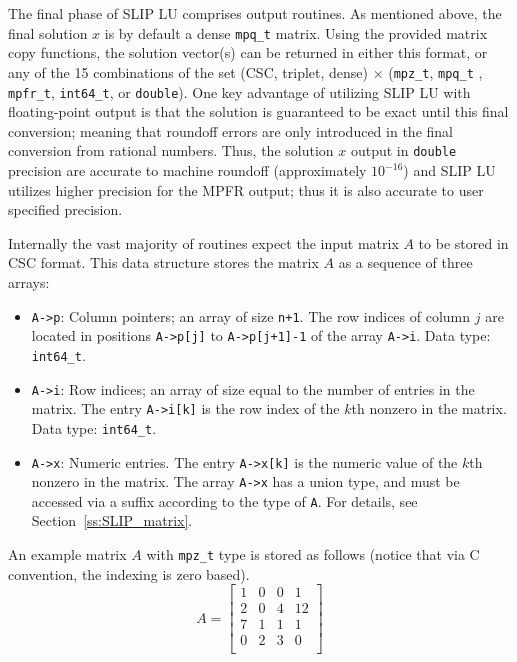 \documentclass[12pt]{article}
\theoremstyle{definition}
\begin{document}
The final phase of SLIP LU comprises output routines. As mentioned above, the
final solution $x$ is by default a dense \verb|mpq_t| matrix. Using the
provided matrix copy functions, the solution vector(s) can be returned in
either this format, or any of the 15 combinations of the set (CSC, triplet,
dense) $\times$ (\verb|mpz_t|, \verb|mpq_t| , \verb|mpfr_t|, \verb|int64_t|, or
\verb|double|).  One key advantage of utilizing SLIP LU with floating-point
output is that the solution is guaranteed to be exact until this final
conversion; meaning that roundoff errors are only introduced in the final
conversion from rational numbers. Thus, the solution $x$ output in
\verb|double| precision are accurate to machine roundoff (approximately
$10^{-16}$) and SLIP LU utilizes higher precision for the MPFR output; thus it
is also accurate to user specified precision.

Internally the vast majority of routines expect the input matrix $A$ to be stored
in CSC format. This data structure stores the matrix $A$ as a sequence of three
arrays:

\begin{itemize}
\item
\verb|A->p|: Column pointers; an array of size \verb|n+1|. The row indices of
column $j$ are located in positions \verb|A->p[j]| to \verb|A->p[j+1]-1| of the
array \verb|A->i|. Data type: \verb|int64_t|.

\item
\verb|A->i|: Row indices; an array of size equal to the number of entries in
the matrix. The entry \verb|A->i[k]| is the row index of the $k$th nonzero in
the matrix. Data type: \verb|int64_t|.

\item
\verb|A->x|: Numeric entries. The entry \verb|A->x[k]| is the numeric value of
the $k$th nonzero in the matrix.  The array \verb|A->x| has a union type, and
must be accessed via a suffix according to the type of \verb|A|.  For details,
see Section~\ref{ss:SLIP_matrix}.

\end{itemize}

An example matrix $A$ with \verb|mpz_t| type is stored as follows (notice that
via C convention, the indexing is zero based).
\[
A = \begin{bmatrix}
1 & 0 & 0 & 1 \\
2 & 0 & 4 & 12 \\
7 & 1 & 1 & 1 \\
0 & 2 & 3 & 0 \\
\end{bmatrix}
\]
\end{document}

